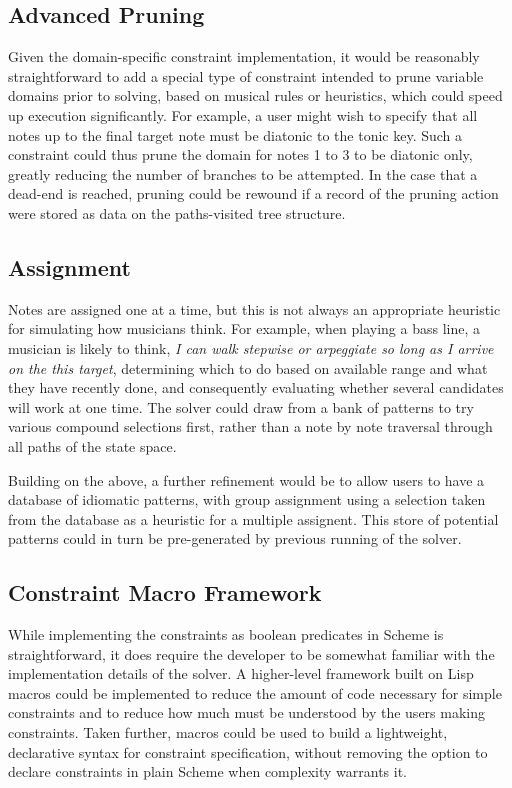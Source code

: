 \documentclass[pmlr]{jmlr}%
\begin{document}
\subsection{Advanced Pruning}
Given the domain-specific constraint implementation, it would be reasonably straightforward
to add a special type of constraint intended to prune variable domains prior to solving,
based on musical rules or heuristics, which could speed up execution significantly.
For example, a user might wish to specify that all notes up to the final target note 
must be diatonic to the tonic key. Such a constraint could
thus prune the domain for notes 1 to 3 to be diatonic only, greatly reducing the number of 
branches to be attempted. 
In the case that a dead-end is reached, pruning could be rewound if
a record of the pruning action were stored as data on the paths-visited tree structure.

\subsection{Assignment}
Notes are assigned one at a time, but this is not always an appropriate heuristic for simulating
how musicians think. For example, when playing a bass line, a musician is likely
to think, \textit{I can walk stepwise or arpeggiate so long as I arrive on the this target},
determining which to do based on available range
and what they have recently done, and consequently evaluating whether several candidates will work 
at one time. The solver could draw from a bank of patterns to try various compound
selections first, rather than a note by note traversal through all paths of the state space.

Building on the above, a further refinement would be to allow users to have 
a database of idiomatic patterns, with group assignment using a selection taken
from the database as a heuristic for a multiple assignent. 
This store of potential patterns could in turn be pre-generated by previous running
of the solver.

\subsection{Constraint Macro Framework}
While implementing the constraints as boolean predicates in Scheme is straightforward, it does
require the developer to be somewhat familiar with the implementation details of
the solver. A higher-level framework built on Lisp macros could be implemented
to reduce the amount of code necessary for simple constraints and to reduce how much must be understood
by the users making constraints. Taken further, macros could be used to build
a lightweight, declarative syntax for constraint specification, without
removing the option to declare constraints in plain Scheme when complexity warrants it.
\end{document}
